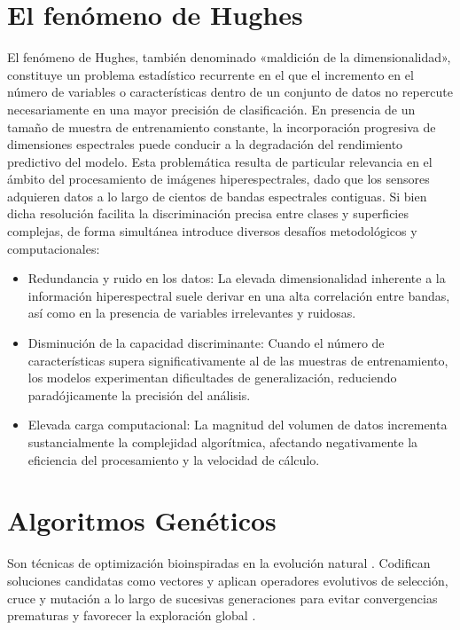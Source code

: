 \section{El fenómeno de Hughes}
El fenómeno de Hughes, también denominado «maldición de la dimensionalidad», constituye un problema estadístico recurrente en el que el incremento en el número de variables o características dentro de un conjunto de datos no repercute necesariamente en una mayor precisión de clasificación. En presencia de un tamaño de muestra de entrenamiento constante, la incorporación progresiva de dimensiones espectrales puede conducir a la degradación del rendimiento predictivo del modelo.  
Esta problemática resulta de particular relevancia en el ámbito del procesamiento de imágenes hiperespectrales, dado que los sensores adquieren datos a lo largo de cientos de bandas espectrales contiguas\cite{hughes_mean_1968, sawant_survey_2020}. Si bien dicha resolución facilita la discriminación precisa entre clases y superficies complejas, de forma simultánea introduce diversos desafíos metodológicos y computacionales:

\begin{itemize}
    \item Redundancia y ruido en los datos: La elevada dimensionalidad inherente a la información hiperespectral suele derivar en una alta correlación entre bandas, así como en la presencia de variables irrelevantes y ruidosas.
    \item Disminución de la capacidad discriminante: Cuando el número de características supera significativamente al de las muestras de entrenamiento, los modelos experimentan dificultades de generalización, reduciendo paradójicamente la precisión del análisis.
    \item Elevada carga computacional: La magnitud del volumen de datos incrementa sustancialmente la complejidad algorítmica, afectando negativamente la eficiencia del procesamiento y la velocidad de cálculo.
\end{itemize}



\section{Algoritmos Genéticos}
Son técnicas de optimización bioinspiradas en la evolución natural \cite{eiben_introduction_2015}. Codifican soluciones candidatas como vectores y aplican operadores evolutivos de selección, cruce y mutación a lo largo de sucesivas generaciones para evitar convergencias prematuras y favorecer la exploración global \cite{deb_multi-objective_2001, eiben_introduction_2015}.

